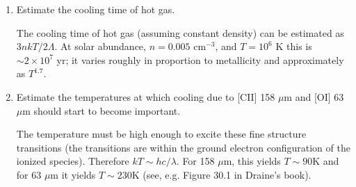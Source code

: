 \begin{enumerate} 
\item Estimate the cooling time of hot gas.
\begin{answer}
The cooling time of hot gas (assuming constant density) can be
estimated as $3nkT / 2 \Lambda$. At solar abundance, $n=0.005$
cm$^{-3}$, and $T=10^6$ K this is $\sim 2 \times 10^7$ yr; it varies
roughly in proportion to metallicity and approximately as $T^{1.7}$.
\end{answer}
\item Estimate the temperatures at which cooling due to [CII]
158 $\mu$m and [OI] 63 $\mu$m should start to become important.

\begin{answer}
The temperature must be high enough to excite these fine structure
transitions (the transitions are within the ground electron
configuration of the ionized species). Therefore $kT \sim hc
/ \lambda$. For 158 $\mu$m, this yields $T \sim 90$K and for 63 $\mu$m
it yields $T\sim 230$K (see, e.g. Figure 30.1 in Draine's book).
\end{answer}


\end{enumerate}
